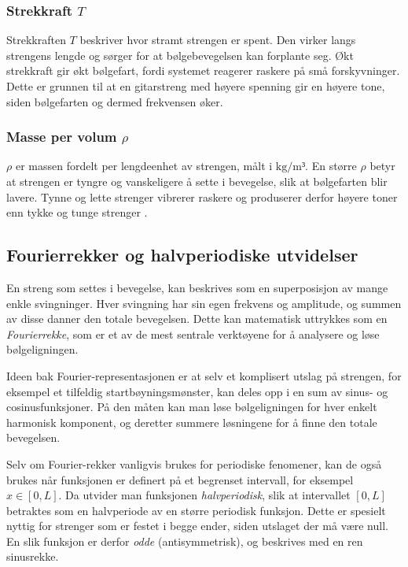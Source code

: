 \subsubsection{Strekkraft \texorpdfstring{$T$}{T}}
Strekkraften $T$ beskriver hvor stramt strengen er spent. 
Den virker langs strengens lengde og sørger for at bølgebevegelsen kan forplante seg. 
Økt strekkraft gir økt bølgefart, fordi systemet reagerer raskere på små forskyvninger. 
Dette er grunnen til at en gitarstreng med høyere spenning gir en høyere tone, siden bølgefarten og dermed frekvensen øker. 
\parencite{NTNUBolgelikning}

\subsubsection{Masse per volum \texorpdfstring{$\rho$}{rho}}
$\rho$ er massen fordelt per lengdeenhet av strengen, målt i $\text{kg/m³}$. 
En større $\rho$ betyr at strengen er tyngre og vanskeligere å sette i bevegelse, slik at bølgefarten blir lavere. 
Tynne og lette strenger vibrerer raskere og produserer derfor høyere toner enn tykke og tunge strenger \parencite{UCFStringLinearDensity}.

\subsection{Fourierrekker og halvperiodiske utvidelser}

En streng som settes i bevegelse, kan beskrives som en superposisjon av mange enkle svingninger.  
Hver svingning har sin egen frekvens og amplitude, og summen av disse danner den totale bevegelsen.  
Dette kan matematisk uttrykkes som en \textit{Fourierrekke}, som er et av de mest sentrale verktøyene for å analysere og løse bølgeligningen.  

Ideen bak Fourier-representasjonen er at selv et komplisert utslag på strengen, for eksempel et tilfeldig startbøyningsmønster, kan deles opp i en sum av sinus- og cosinusfunksjoner.  
På den måten kan man løse bølgeligningen for hver enkelt harmonisk komponent, og deretter summere løsningene for å finne den totale bevegelsen.  

Selv om Fourier-rekker vanligvis brukes for periodiske fenomener, kan de også brukes når funksjonen er definert på et begrenset intervall, for eksempel $x \in [0,L]$.  
Da utvider man funksjonen \textit{halvperiodisk}, slik at intervallet $[0,L]$ betraktes som en halvperiode av en større periodisk funksjon.  
Dette er spesielt nyttig for strenger som er festet i begge ender, siden utslaget der må være null.  
En slik funksjon er derfor \textit{odde} (antisymmetrisk), og beskrives med en ren sinusrekke. \parencite{intmathHalfRange}

